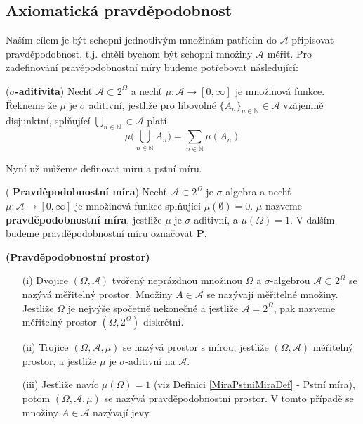 \subsection{Axiomatická pravděpodobnost}

Naším cílem je být schopni jednotlivým množinám patřícím do $\mathcal{A}$ připisovat pravděpodobnost, t.j. chtěli bychom být schopni množiny $\mathcal{A}$ měřit. Pro zadefinování pravěpodobnostní míry budeme potřebovat následující:


\begin{definition}\label{SihmaAditivitaDef}(\textbf{$\sigma$-aditivita})
Nechť $\mathcal{A}\subset 2^{\Omega}$ a nechť $\mu : \mathcal{A} \longrightarrow [0,\infty]$ je množinová funkce. Řekneme že $\mu$ je $\sigma$ aditivní, jestliže pro libovolné $\lbrace A_{n} \rbrace_{n\in \mathbb{N}} \in \mathcal{A} $ vzájemně disjunktní, splňující $\bigcup_{n \in \mathbb{N}}\in \mathcal{A}$ platí 
\begin{equation}\label{SihmaAditivitaRce}\nonumber
\mu \bigg( \bigcup_{n \in \mathbb{N}}A_{n} \bigg) = \sum_{n \in \mathbb{N}} \mu(A_{n})
\end{equation}

\end{definition}

Nyní už můžeme definovat míru a pstní míru.

\begin{definition}\label{MiraPstniMiraDef}(\textbf{ Pravděpodobnostní míra})
Nechť $\mathcal{A} \subset 2^{\Omega}$ je $\sigma$-algebra a nechť $\mu:\mathcal{A} \longrightarrow [0,\infty]$ je množinová funkce splňující $\mu(\emptyset) = 0$. $\mu$ nazveme \textbf{pravděpodobnostní míra}, jestliže $\mu$ je $\sigma$-aditivní, a $\mu(\Omega) = 1$.
V dalším budeme pravděpodobnostní míru označovat $\mathbf{P}$.
\end{definition}

\begin{definition}\label{PstniProstor}\textbf{(Pravděpodobnostní prostor)}
\begin{itemize}
\item[(i)] Dvojice $(\Omega, \mathcal{A})$ tvořený neprázdnou množinou $\Omega$ a $\sigma$-algebrou $\mathcal{A}\subset 2^{\Omega}$ se nazývá měřitelný prostor. Množiny $A \in \mathcal{A}$ se nazývají měřitelné množiny. Jestliže $\Omega$ je nejvýše spočetně nekonečné a jestliže $\mathcal{A} = 2^{\Omega}$, pak nazveme měřitelný prostor $(\Omega, 2^{\Omega})$ diskrétní.
\item[(ii)] Trojice $(\Omega, \mathcal{A}, \mu)$ se nazývá prostor s mírou, jestliže $(\Omega, \mathcal{A})$ měřitelný prostor, a jestliže $\mu$ je $\sigma$-aditivní na $\mathcal{A}$.
\item[(iii)] Jestliže navíc $\mu(\Omega)= 1$ (viz Definici \ref{MiraPstniMiraDef} - Pstní míra), potom $(\Omega, \mathcal{A}, \mu)$ se nazývá pravděpodobnostní prostor. V tomto případě se množiny $A \in \mathcal{A}$ nazývají jevy.
\end{itemize}
\end{definition}

